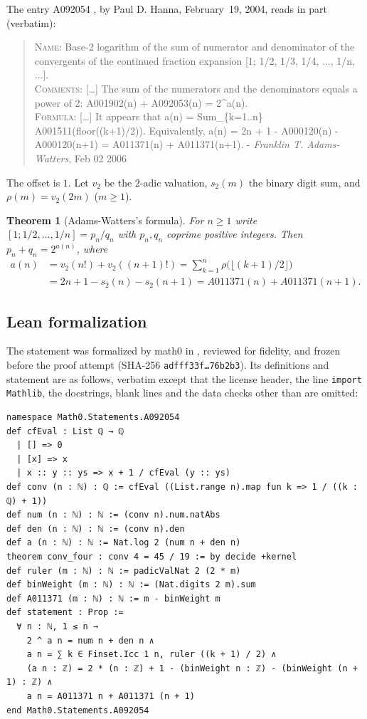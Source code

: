 \documentclass[11pt]{amsart}
\theoremstyle{plain}
\newtheorem{theorem}{Theorem}
\theoremstyle{definition}
\begin{document}
The entry A092054 \cite{A092054}, by Paul D. Hanna, February~19, 2004, reads in part (verbatim):
\begin{quote}\raggedright\small
\textsc{Name}: Base-2 logarithm of the sum of numerator and denominator of the convergents of the continued fraction expansion [1; 1/2, 1/3, 1/4, ..., 1/n, ...].\\[2pt]
\textsc{Comments}: [\dots] The sum of the numerators and the denominators equals a power of 2: A001902(n) + A092053(n) = 2\^{}a(n).\\[2pt]
\textsc{Formula}: [\dots] It appears that a(n) = Sum\_\{k=1..n\} A001511(floor((k+1)/2)). Equivalently, a(n) = 2n + 1 - A000120(n) - A000120(n+1) = A011371(n) + A011371(n+1). - \emph{Franklin T. Adams-Watters}, Feb 02 2006
\end{quote}
The offset is $1$. Let $v_2$ be the $2$-adic valuation, $s_2(m)$ the binary digit sum, and $\rho(m)=v_2(2m)$ ($m\ge1$).

\begin{theorem}[Adams-Watters's formula]\label{thm:main}
For $n\ge1$ write $[1;1/2,\dots,1/n]=p_n/q_n$ with $p_n,q_n$ coprime positive integers. Then $p_n+q_n=2^{a(n)}$, where
\begin{align*}
  a(n)&=v_2(n!)+v_2((n+1)!)=\textstyle\sum_{k=1}^{n}\rho\bigl(\lfloor (k+1)/2\rfloor\bigr)\\
  &=2n+1-s_2(n)-s_2(n+1)=A011371(n)+A011371(n+1).
\end{align*}
\end{theorem}

\subsection*{Lean formalization}
The statement was formalized by math0 in , reviewed for fidelity, and frozen before the proof attempt (SHA-256 \texttt{adfff33f\dots76b2b3}). Its definitions and statement are as follows, verbatim except that the license header, the line \texttt{import Mathlib}, the docstrings, blank lines and the data checks other than  are omitted:
\begin{lstlisting}[basicstyle=\ttfamily\footnotesize]
namespace Math0.Statements.A092054
def cfEval : List ℚ → ℚ
  | [] => 0
  | [x] => x
  | x :: y :: ys => x + 1 / cfEval (y :: ys)
def conv (n : ℕ) : ℚ := cfEval ((List.range n).map fun k => 1 / ((k : ℚ) + 1))
def num (n : ℕ) : ℕ := (conv n).num.natAbs
def den (n : ℕ) : ℕ := (conv n).den
def a (n : ℕ) : ℕ := Nat.log 2 (num n + den n)
theorem conv_four : conv 4 = 45 / 19 := by decide +kernel
def ruler (m : ℕ) : ℕ := padicValNat 2 (2 * m)
def binWeight (m : ℕ) : ℕ := (Nat.digits 2 m).sum
def A011371 (m : ℕ) : ℕ := m - binWeight m
def statement : Prop :=
  ∀ n : ℕ, 1 ≤ n →
    2 ^ a n = num n + den n ∧
    a n = ∑ k ∈ Finset.Icc 1 n, ruler ((k + 1) / 2) ∧
    (a n : ℤ) = 2 * (n : ℤ) + 1 - (binWeight n : ℤ) - (binWeight (n + 1) : ℤ) ∧
    a n = A011371 n + A011371 (n + 1)
end Math0.Statements.A092054
\end{lstlisting}
\end{document}

